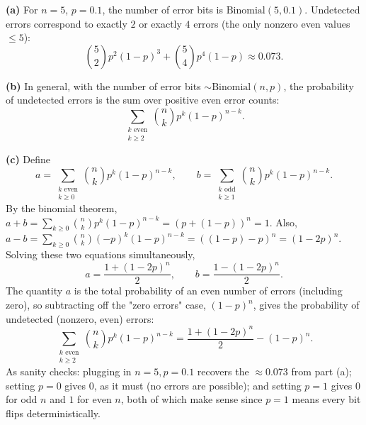 \documentclass{article}
\begin{document}
\medskip
\textbf{(a)} For $n=5$, $p=0.1$, the number of error bits is $\text{Binomial}(5,0.1)$. Undetected errors correspond to exactly $2$ or exactly $4$ errors (the only nonzero even values $\le 5$):
$$
\binom{5}{2}p^2(1-p)^3 + \binom{5}{4}p^4(1-p) \approx 0.073.
$$

\medskip
\textbf{(b)} In general, with the number of error bits $\sim\text{Binomial}(n,p)$, the probability of undetected errors is the sum over positive even error counts:
$$
\sum_{\substack{k \text{ even}\\ k\ge 2}}\binom{n}{k}p^k(1-p)^{n-k}.
$$

\medskip
\textbf{(c)} Define
$$
a=\sum_{\substack{k\text{ even}\\k\ge0}}\binom{n}{k}p^k(1-p)^{n-k}, \qquad b=\sum_{\substack{k\text{ odd}\\k\ge1}}\binom{n}{k}p^k(1-p)^{n-k}.
$$
By the binomial theorem, $a+b=\sum_{k\ge0}\binom{n}{k}p^k(1-p)^{n-k}=(p+(1-p))^n=1$. Also, $a-b=\sum_{k\ge0}\binom{n}{k}(-p)^k(1-p)^{n-k}=((1-p)-p)^n=(1-2p)^n$. Solving these two equations simultaneously,
$$
a=\frac{1+(1-2p)^n}{2}, \qquad b=\frac{1-(1-2p)^n}{2}.
$$
The quantity $a$ is the total probability of an even number of errors (including zero), so subtracting off the "zero errors" case, $(1-p)^n$, gives the probability of undetected (nonzero, even) errors:
$$
\sum_{\substack{k\text{ even}\\k\ge2}}\binom{n}{k}p^k(1-p)^{n-k} = \frac{1+(1-2p)^n}{2}-(1-p)^n.
$$
As sanity checks: plugging in $n=5,p=0.1$ recovers the $\approx0.073$ from part (a); setting $p=0$ gives $0$, as it must (no errors are possible); and setting $p=1$ gives $0$ for odd $n$ and $1$ for even $n$, both of which make sense since $p=1$ means every bit flips deterministically.
\end{document}
